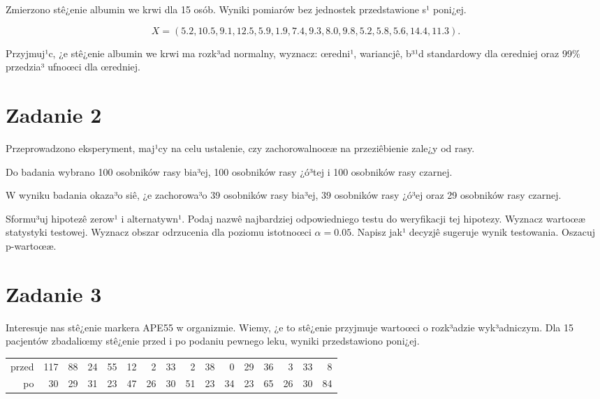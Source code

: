 \documentclass[a4paper,12pt]{article}
\begin{document}
     Zmierzono stê¿enie albumin we krwi dla 15 osób. 
     Wyniki pomiarów bez jednostek przedstawione s¹ poni¿ej. 
     
     \noindent $$X=(  5.2, 10.5,  9.1, 12.5,  5.9,  1.9,  7.4,  9.3,  8.0,  9.8,  5.2,  5.8,  5.6, 14.4, 11.3 ).$$
     
     Przyjmuj¹c, ¿e stê¿enie albumin we krwi ma rozk³ad normalny, 
     wyznacz: œredni¹, wariancjê, b³¹d standardowy dla œredniej oraz 99\% przedzia³ ufnoœci dla œredniej. \vspace{1cm} 

  \section*{Zadanie 2}
     
  Przeprowadzono eksperyment, maj¹cy na celu ustalenie, czy zachorowalnoœæ na przeziêbienie zale¿y od rasy.
  
  Do badania wybrano 100 osobników rasy bia³ej, 100 osobników rasy ¿ó³tej i 100 osobników rasy czarnej. 
  
  W wyniku badania okaza³o siê, ¿e zachorowa³o 39 osobników rasy bia³ej, 39 osobników rasy ¿ó³ej oraz 29 osobników rasy czarnej. 
  
  Sformu³uj hipotezê zerow¹ i alternatywn¹. 
  Podaj nazwê najbardziej odpowiedniego testu do weryfikacji tej hipotezy. 
  Wyznacz wartoœæ statystyki testowej. 
  Wyznacz obszar odrzucenia dla poziomu istotnoœci $\alpha=0.05$. 
  Napisz jak¹ decyzjê sugeruje wynik testowania. Oszacuj p-wartoœæ. \vspace{1cm} 

  \section*{Zadanie 3}
     
  Interesuje nas stê¿enie markera APE55  w organizmie. 
  Wiemy, ¿e to stê¿enie przyjmuje wartoœci o rozk³adzie wyk³adniczym. 
  Dla 15 pacjentów zbadaliœmy stê¿enie przed i po podaniu pewnego leku, 
  wyniki przedstawiono poni¿ej.
  
  \vspace{0.5cm} 
  \noindent\begin{center} 
\begin{tabular}{rrrrrrrrrrrrrrrr}
  \hline
  \hline
przed & 117 & 88 & 24 & 55 & 12 & 2 & 33 & 2 & 38 & 0 & 29 & 36 & 3 & 33 & 8 \\
  po & 30 & 29 & 31 & 23 & 47 & 26 & 30 & 51 & 23 & 34 & 23 & 65 & 26 & 30 & 84 \\
   \hline
\end{tabular}
 
  \end{center} 
  \vspace{0.5cm}
  
\end{document}
